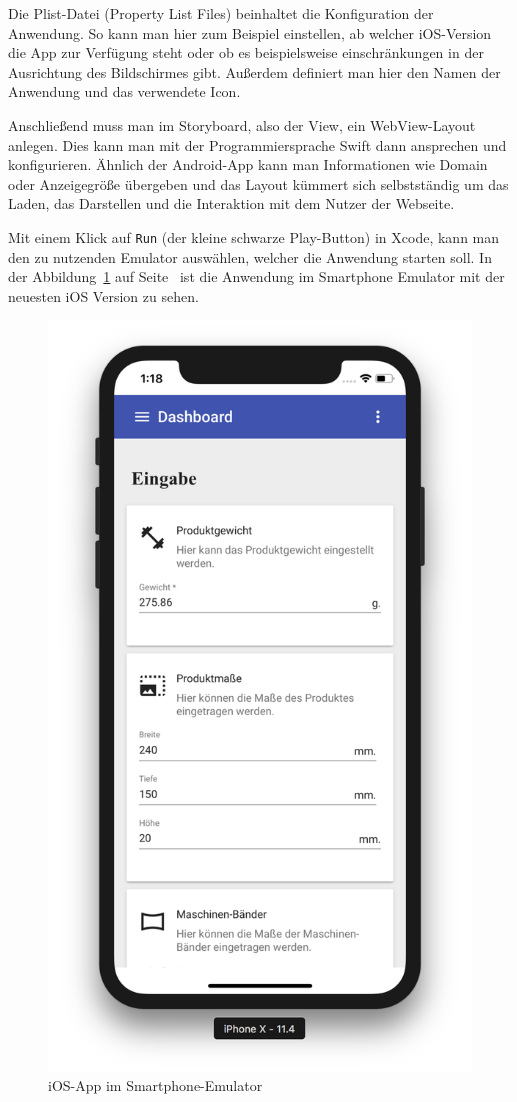 Die Plist-Datei (Property List Files) beinhaltet die Konfiguration der Anwendung. So kann man hier zum Beispiel
einstellen, ab welcher iOS-Version die App zur Verfügung steht oder ob es beispielsweise einschränkungen in der
Ausrichtung des Bildschirmes gibt. Außerdem definiert man hier den Namen der Anwendung und das verwendete Icon.

Anschließend muss man im Storyboard, also der View, ein WebView-Layout anlegen. Dies kann man mit der Programmiersprache
Swift dann ansprechen und konfigurieren. Ähnlich der Android-App kann man Informationen wie Domain oder Anzeigegröße
übergeben und das Layout kümmert sich selbstständig um das Laden, das Darstellen und die Interaktion mit dem Nutzer der
Webseite.

Mit einem Klick auf \texttt{Run} (der kleine schwarze Play-Button) in Xcode, kann man den zu nutzenden Emulator
auswählen, welcher die Anwendung starten soll. In der Abbildung~\ref{fig:umsetzung_ios_app} auf
Seite~\pageref{fig:umsetzung_ios_app} ist die Anwendung im Smartphone Emulator mit der neuesten iOS Version zu sehen.

\begin{figure}[h]
    \centering
    \includegraphics[scale=0.35]{images/kapitel_4/ios_app.png}
    \caption{iOS-App im Smartphone-Emulator}
    \label{fig:umsetzung_ios_app}
\end{figure}